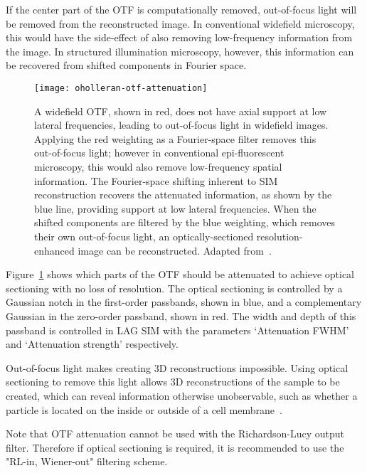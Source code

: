 If the center part of the OTF is computationally removed, out-of-focus light will be removed from the reconstructed image.
In conventional widefield microscopy, this would have the side-effect of also removing low-frequency information from the image. 
In structured illumination microscopy, however, this information can be recovered from shifted components in Fourier space. 

\begin{figure}[htbp!]
\centering
\texttt{[image: oholleran-otf-attenuation]}
\caption[LAG SIM: OTF attenuation removes out of focus light]{A widefield OTF, shown in red, does not have axial support at low lateral frequencies, leading to out-of-focus light in widefield images. Applying the red weighting as a Fourier-space filter removes this out-of-focus light; however in conventional epi-fluorescent microscopy, this would also remove low-frequency spatial information. The Fourier-space shifting inherent to SIM reconstruction recovers the attenuated information, as shown by the blue line, providing support at low lateral frequencies. When the shifted components are filtered by the blue weighting, which removes their own out-of-focus light, an optically-sectioned resolution-enhanced image can be reconstructed.  Adapted from~\cite{oholleran2014optimized}. }
\label{fig:oholleran-otf}
\end{figure}

Figure~\ref{fig:oholleran-otf} shows which parts of the OTF should be attenuated to achieve optical sectioning with no loss of resolution. 
The optical sectioning is controlled by a Gaussian notch in the first-order passbands, shown in blue, and a complementary Gaussian in the zero-order passband, shown in red. 
The width and depth of this passband is controlled in LAG SIM with the parameters `Attenuation FWHM' and `Attenuation strength' respectively.


Out-of-focus light makes creating 3D reconstructions impossible. %
Using optical sectioning to remove this light allows 3D reconstructions of the sample to be created, which can reveal information otherwise unobservable, such as whether a particle is located on the inside or outside of a cell membrane~\cite{teplensky2017temperature}. 

Note that OTF attenuation cannot be used with the Richardson-Lucy output filter. 
Therefore if optical sectioning is required, it is recommended to use the "RL-in, Wiener-out" filtering scheme. 


